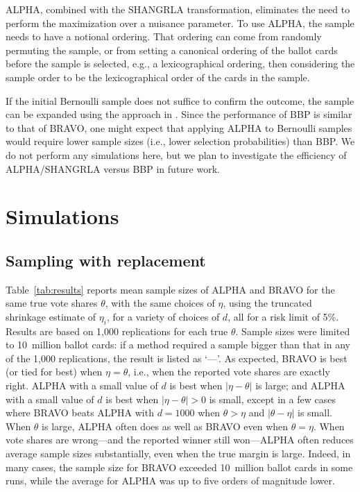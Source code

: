 \documentclass[aoas]{imsart}
\begin{document}
ALPHA, combined with the SHANGRLA transformation, eliminates the need to perform the maximization
over a nuisance parameter.
To use ALPHA, the sample needs to have a notional ordering.
That ordering can come from randomly permuting the sample, or from setting a
canonical ordering of the ballot cards before the sample is selected, e.g., a lexicographical ordering,
then considering the sample order to be the lexicographical order of the cards in the sample.

If the initial Bernoulli sample does not suffice to confirm the outcome, the sample can be expanded
using the approach in \citet[Section 4]{ottoboniEtal20}.
Since the performance of BBP is similar to that of BRAVO, one might
expect that applying ALPHA to Bernoulli samples would require lower sample sizes (i.e., lower selection probabilities)
than BBP.
We do not perform any simulations here, but we plan to investigate the efficiency of ALPHA/SHANGRLA
versus BBP in future work.


\section{Simulations}

\subsection{Sampling with replacement}
Table~\ref{tab:results} reports mean sample sizes of ALPHA and BRAVO for the same true vote shares $\theta$,
with the same choices of $\eta$, using the truncated shrinkage estimate of $\eta_i$, for a variety of choices of $d$,
all for a risk limit of 5\%.
Results are based on 1,000 replications for each true $\theta$.
Sample sizes were limited to 10~million ballot cards: if a method required a sample bigger than that in any of the 1,000
replications, the result is listed as `---'.
As expected, BRAVO is best (or tied for best) when $\eta = \theta$, i.e., when the reported vote shares are exactly right.
ALPHA with a small value of $d$ is best when $|\eta - \theta|$ is large; and ALPHA with a small value of $d$ is
best when $|\eta - \theta|>0$ is small, except in a few cases where BRAVO beats ALPHA with $d=1000$ when $\theta > \eta$ and
$|\theta - \eta|$ is small.
When $\theta$ is large, ALPHA often does as well as BRAVO even when $\theta=\eta$.
When vote shares are wrong---and the reported winner still won---ALPHA often reduces
average sample sizes substantially, even when the true margin is large.
Indeed, in many cases, the sample size for BRAVO exceeded 10~million ballot cards in some runs, while the average for ALPHA was
up to five orders of magnitude lower.
\end{document}
